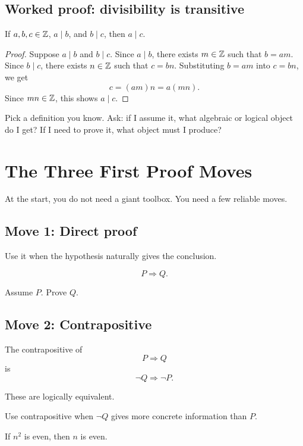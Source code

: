 \documentclass[11pt]{article}
\begin{document}
\subsection{Worked proof: divisibility is transitive}

\begin{theorem}
If $a,b,c\in\mathbb{Z}$, $a\mid b$, and $b\mid c$, then $a\mid c$.
\end{theorem}

\begin{proof}
Suppose $a\mid b$ and $b\mid c$. Since $a\mid b$, there exists $m\in\mathbb{Z}$ such that $b=am$. Since $b\mid c$, there exists $n\in\mathbb{Z}$ such that $c=bn$. Substituting $b=am$ into $c=bn$, we get
\[
c=(am)n=a(mn).
\]
Since $mn\in\mathbb{Z}$, this shows $a\mid c$.
\end{proof}

\begin{walkbox}
Pick a definition you know. Ask: if I assume it, what algebraic or logical object do I get? If I need to prove it, what object must I produce?
\end{walkbox}

\newpage
\section{The Three First Proof Moves}

At the start, you do not need a giant toolbox. You need a few reliable moves.

\subsection{Move 1: Direct proof}

Use it when the hypothesis naturally gives the conclusion.

\[
P\Rightarrow Q.
\]

Assume $P$. Prove $Q$.

\subsection{Move 2: Contrapositive}

The contrapositive of
\[
P\Rightarrow Q
\]
is
\[
\neg Q\Rightarrow \neg P.
\]

These are logically equivalent.

Use contrapositive when $\neg Q$ gives more concrete information than $P$.

\begin{theorem}
If $n^2$ is even, then $n$ is even.
\end{theorem}
\end{document}
